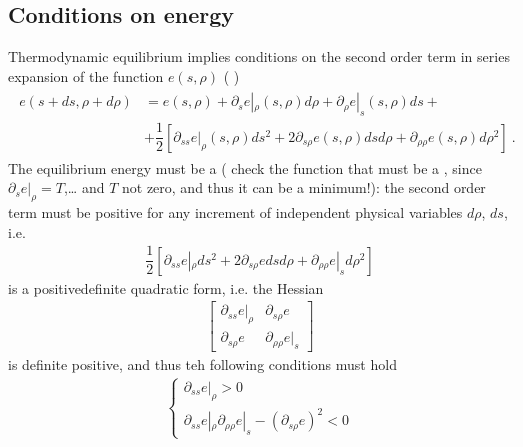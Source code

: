 \documentclass[letterpaper,10pt,english]{jupyterBook}
\begin{document}
\subsection{Conditions on energy}
\label{\detokenize{ch/coefficients:conditions-on-energy}}
\sphinxAtStartPar
Thermodynamic equilibrium implies conditions on the second order term in series expansion of the function \(e(s, \rho)\) ( )
\begin{equation*}
\begin{split}\begin{aligned}
  e(s+ds, \rho+d\rho) 
  & = e(s, \rho) + \partial_s e|_{\rho} (s,\rho) d \rho + \partial_\rho e|_{s} (s, \rho) ds + \\
  & + \dfrac{1}{2} \left[ \partial_{ss} e|_{\rho}(s,\rho) ds^2 + 2 \partial_{s\rho} e(s, \rho) ds d\rho + \partial_{\rho \rho} e(s, \rho) d \rho^2 \right] \ .
\end{aligned}\end{split}
\end{equation*}
\sphinxAtStartPar
The equilibrium energy must be a  ( check the function that must be a , since \(\partial_s e|_{\rho} = T\),… and \(T\) not zero, and thus it can be a minimum!): the second order term must be positive for any increment of independent physical variables \(d \rho\), \(d s\), i.e.
\begin{equation*}
\begin{split}\dfrac{1}{2} \left[ \partial_{ss} e|_{\rho} ds^2 + 2 \partial_{s\rho} e ds d\rho + \partial_{\rho \rho} e|_{s} d \rho^2 \right] \end{split}
\end{equation*}
\sphinxAtStartPar
is a positive\sphinxhyphen{}definite quadratic form, i.e. the Hessian
\begin{equation*}
\begin{split}\begin{bmatrix} \partial_{ss} e|_{\rho} & \partial_{s \rho} e \\ \partial_{s \rho } e & \partial_{\rho \rho} e|_{s} \end{bmatrix} \end{split}
\end{equation*}
\sphinxAtStartPar
is definite positive, and thus teh following conditions must hold
\begin{equation*}
\begin{split}\begin{cases}
  \partial_{ss} e|_{\rho} > 0 \\
  \partial_{ss} e|_{\rho} \partial_{\rho \rho} e|_{s} - \left( \partial_{s \rho} e \right)^2 < 0
\end{cases}\end{split}
\end{equation*}
\end{document}
